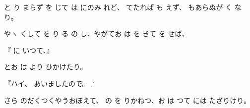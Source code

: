 と
り
まらず
を
じて
は
にのみ
れど、
てたれば
も
えず、
もあらぬが
く
なり。

やヽ
くして
を
り
る
の
し、やがてお
は
を
きて
を
せば、

『
に
いつて、』

とお
は
より
ひかけたり。

『ハイ、
あいましたので。
』

さら
のだくつくやうおぼえて、
の
を
りかねつ、お
は
つて
には
たざりけり。

